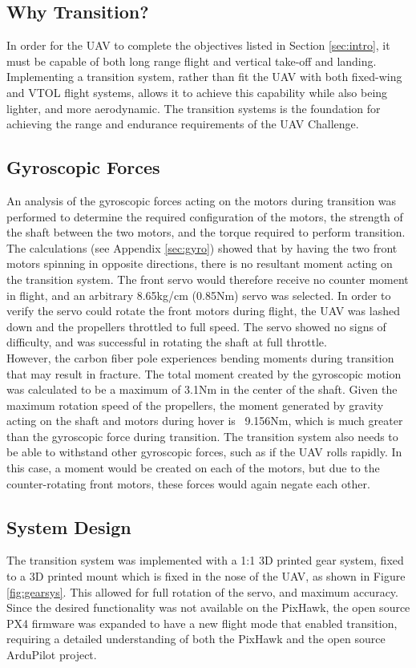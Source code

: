 \label{sec:transition}
\subsection{Why Transition?}
In order for the UAV to complete the objectives listed in Section \ref{sec:intro}, it must be capable of both long range flight and vertical take-off and landing. Implementing a transition system, rather than fit the UAV with both fixed-wing and VTOL flight systems, allows it to achieve this capability while also being lighter, and more aerodynamic. The transition systems is the foundation for achieving the range and endurance requirements of the UAV Challenge.

\subsection{Gyroscopic Forces}
An analysis of the gyroscopic forces acting on the motors during transition was performed to determine the required configuration of the motors, the strength of the shaft between the two motors, and the torque required to perform transition. The calculations (see Appendix  \ref{sec:gyro}) showed that by having the two front motors spinning in opposite directions, there is no resultant moment acting on the transition system. The front servo would therefore receive no counter moment in flight, and an arbitrary 8.65kg/cm (0.85Nm) servo was selected. In order to verify the servo could rotate the front motors during flight, the UAV was lashed down and the propellers throttled to full speed. The servo showed no signs of difficulty, and was successful in rotating the shaft at full throttle.\\

However, the carbon fiber pole experiences bending moments during transition that may result in fracture. The total moment created by the gyroscopic motion was calculated to be a maximum of 3.1Nm in the center of the shaft. Given the maximum rotation speed of the propellers, the moment generated by gravity acting on the shaft and motors during hover is ~9.156Nm, which is much greater than the gyroscopic force during transition. The transition system also needs to be able to withstand other gyroscopic forces, such as if the UAV rolls rapidly. In this case, a moment would be created on each of the motors, but due to the counter-rotating front motors, these forces would again negate each other.

\subsection{System Design}
\label{sec:controller}
The transition system was implemented with a 1:1 3D printed gear system, fixed to a 3D printed mount which is fixed in the nose of the UAV, as shown in Figure \ref{fig:gearsys}. This allowed for full rotation of the servo, and maximum accuracy. Since the desired functionality was not available on the PixHawk, the open source PX4 firmware was expanded to have a new flight mode that enabled transition, requiring a detailed understanding of both the PixHawk \cite{ref:firmware1} and the open source ArduPilot \cite{ref:firmware2} project.

